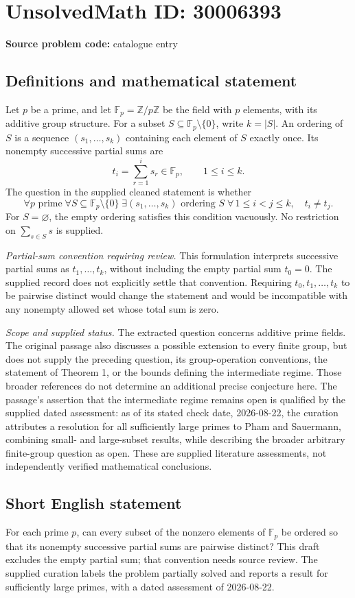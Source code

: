 \documentclass[11pt]{article}
\newcommand{\Z}{\mathbb{Z}}
\newcommand{\F}{\mathbb{F}}
\begin{document}
\section*{UnsolvedMath ID: 30006393}
\textbf{Source problem code:} catalogue entry
\subsection{Definitions and mathematical statement}
Let \(p\) be a prime, and let \(\F_p=\Z/p\Z\) be the field with \(p\) elements, with its additive group structure. For a subset \(S\subseteq\F_p\setminus\{0\}\), write \(k=|S|\). An ordering of \(S\) is a sequence \((s_1,\ldots,s_k)\) containing each element of \(S\) exactly once. Its nonempty successive partial sums are
\[
 t_i=\sum_{r=1}^{i}s_r\in\F_p,\qquad 1\leq i\leq k.
\]
The question in the supplied cleaned statement is whether
\[
 \forall p\text{ prime}\;\forall S\subseteq\F_p\setminus\{0\}\;\exists(s_1,\ldots,s_k)\text{ ordering }S\;\forall\,1\leq i<j\leq k,\quad t_i\ne t_j.
\]
For \(S=\varnothing\), the empty ordering satisfies this condition vacuously. No restriction on \(\sum_{s\in S}s\) is supplied.

\emph{Partial-sum convention requiring review.} This formulation interprets successive partial sums as \(t_1,\ldots,t_k\), without including the empty partial sum \(t_0=0\). The supplied record does not explicitly settle that convention. Requiring \(t_0,t_1,\ldots,t_k\) to be pairwise distinct would change the statement and would be incompatible with any nonempty allowed set whose total sum is zero.

\emph{Scope and supplied status.} The extracted question concerns additive prime fields. The original passage also discusses a possible extension to every finite group, but does not supply the preceding question, its group-operation conventions, the statement of Theorem 1, or the bounds defining the intermediate regime. Those broader references do not determine an additional precise conjecture here. The passage's assertion that the intermediate regime remains open is qualified by the supplied dated assessment: as of its stated check date, 2026-08-22, the curation attributes a resolution for all sufficiently large primes to Pham and Sauermann, combining small- and large-subset results, while describing the broader arbitrary finite-group question as open. These are supplied literature assessments, not independently verified mathematical conclusions.
\subsection{Short English statement}
For each prime \(p\), can every subset of the nonzero elements of \(\F_p\) be ordered so that its nonempty successive partial sums are pairwise distinct? This draft excludes the empty partial sum; that convention needs source review. The supplied curation labels the problem partially solved and reports a result for sufficiently large primes, with a dated assessment of 2026-08-22.
\end{document}
